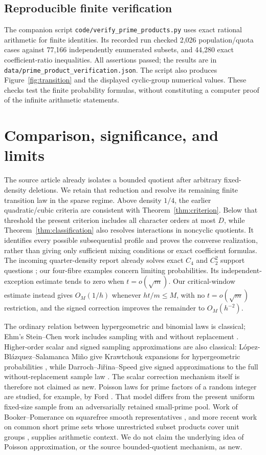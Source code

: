 \documentclass[11pt]{article}
\theoremstyle{remark}\newtheorem{remark}[theorem]{Remark}
\begin{document}
\subsection*{Reproducible finite verification}
The companion script \texttt{code/verify\_prime\_products.py} uses exact rational arithmetic for finite identities. Its recorded run checked 2,026 population/quota cases against 77,166 independently enumerated subsets, and 44,280 exact coefficient-ratio inequalities. All assertions passed; the results are in \texttt{data/prime\_product\_verification.json}. The script also produces Figure~\ref{fig:transition} and the displayed cyclic-group numerical values. These checks test the finite probability formulas, without constituting a computer proof of the infinite arithmetic statements.

\section{Comparison, significance, and limits}\label{sec:comparison}

The source article already isolates a bounded quotient after arbitrary fixed-density deletions. We retain that reduction and resolve its remaining finite transition law in the sparse regime. Above density $1/4$, the earlier quadratic/cubic criteria are consistent with Theorem~\ref{thm:criterion}. Below that threshold the present criterion includes all character orders at most $D$, while Theorem~\ref{thm:classification} also resolves interactions in noncyclic quotients. It identifies every possible subsequential profile and proves the converse realization, rather than giving only sufficient mixing conditions or exact coefficient formulas. The incoming quarter-density report already solves exact $C_4$ and $C_2^2$ support questions \cite{quarter}; our four-fibre examples concern limiting probabilities. Its independent-exception estimate tends to zero when $t=o(\sqrt m)$. Our critical-window estimate instead gives $O_M(1/h)$ whenever $ht/m\le M$, with no $t=o(\sqrt m)$ restriction, and the signed correction improves the remainder to $O_M(h^{-2})$.

The ordinary relation between hypergeometric and binomial laws is classical; Ehm's Stein--Chen work includes sampling with and without replacement \cite{Ehm}. Higher-order scalar and signed sampling approximations are also classical: L\'opez-Bl\'azquez--Salamanca Mi\~no give Krawtchouk expansions for hypergeometric probabilities \cite{LS}, while Darroch--Ji\v rina--Speed give signed approximations to the full without-replacement sample law \cite{DJS}. The scalar correction mechanism itself is therefore not claimed as new. Poisson laws for prime factors of a random integer are studied, for example, by Ford \cite{Ford}. That model differs from the present uniform fixed-size sample from an adversarially retained small-prime pool. Work of Booker--Pomerance on squarefree smooth representatives \cite{BP}, and more recent work on common short prime sets whose unrestricted subset products cover unit groups \cite{Hughes}, supplies arithmetic context. We do not claim the underlying idea of Poisson approximation, or the source bounded-quotient mechanism, as new.
\end{document}
